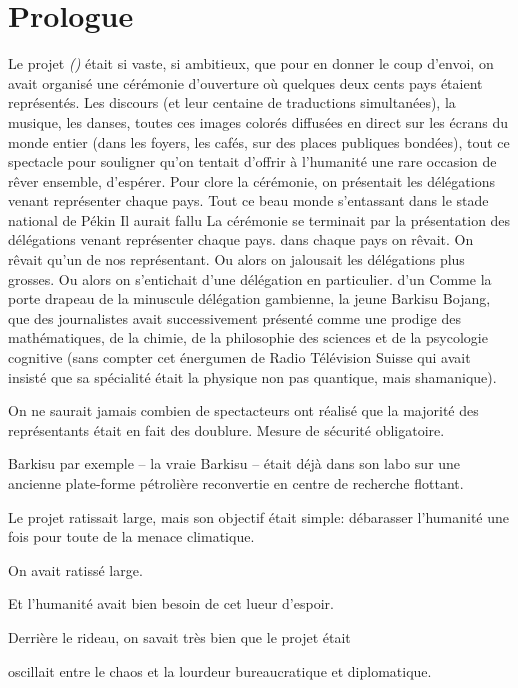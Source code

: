 \chapter*{Prologue}

Le projet \textit{\nomProjet{} (\nomProjetEn{})} était si vaste, si ambitieux,
que pour en donner le coup d'envoi, on avait organisé une cérémonie d'ouverture
où quelques deux cents pays étaient représentés.  
%
Les discours (et leur centaine de traductions simultanées), la
musique, les danses, toutes ces images colorés diffusées en direct sur les
écrans du monde entier (dans les foyers, les cafés, sur des places publiques
bondées), tout ce spectacle pour souligner qu'on tentait d'offrir à l'humanité
une rare occasion de rêver ensemble, d'espérer.
%
Pour clore la cérémonie, on présentait les délégations venant représenter
chaque pays.
Tout ce beau monde s'entassant dans le stade national de Pékin
Il aurait fallu
La cérémonie se terminait par la présentation des délégations venant
représenter chaque pays.
dans chaque pays on rêvait. On rêvait qu'un de nos représentant.  Ou alors on
jalousait les délégations plus grosses.  Ou alors on s'entichait d'une
délégation en particulier.  d'un Comme la porte drapeau de la minuscule
délégation gambienne, la jeune Barkisu Bojang, que des journalistes avait
successivement présenté comme une prodige des mathématiques, de la chimie, de
la philosophie des sciences et de la psycologie cognitive (sans compter cet
énergumen de Radio Télévision Suisse qui avait insisté que sa spécialité était
la physique non pas quantique, mais shamanique).

On ne saurait jamais combien de spectacteurs ont réalisé que la majorité des représentants 
était en fait des doublure. Mesure de sécurité obligatoire.

Barkisu par exemple -- la vraie Barkisu -- était déjà dans son labo sur une
ancienne plate-forme pétrolière reconvertie en centre de recherche flottant.

Le projet \nomProjet{} ratissait large, mais son objectif était simple:
débarasser l'humanité une fois pour toute de la menace climatique. 



On avait ratissé large.


Et l'humanité avait bien besoin de cet lueur d'espoir.

Derrière le rideau, on savait très bien que le projet \nomProjet{} était 

oscillait entre le chaos et la lourdeur bureaucratique et diplomatique.

